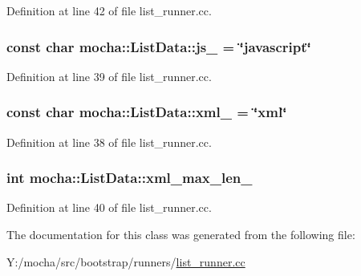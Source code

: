 Definition at line 42 of file list\_\-runner.cc.

\hypertarget{classmocha_1_1_list_data_afc7ac4f9f909eb970989228d912cd825}{
\subsubsection[{js\_\-}]{\setlength{\rightskip}{0pt plus 5cm}const char {\bf mocha::ListData::js\_\-} = \char`\"{}javascript\char`\"{}}}
\label{classmocha_1_1_list_data_afc7ac4f9f909eb970989228d912cd825}


Definition at line 39 of file list\_\-runner.cc.

\hypertarget{classmocha_1_1_list_data_a252cac8a2b901e070658b35d493c9e4e}{
\subsubsection[{xml\_\-}]{\setlength{\rightskip}{0pt plus 5cm}const char {\bf mocha::ListData::xml\_\-} = \char`\"{}xml\char`\"{}}}
\label{classmocha_1_1_list_data_a252cac8a2b901e070658b35d493c9e4e}


Definition at line 38 of file list\_\-runner.cc.

\hypertarget{classmocha_1_1_list_data_ae618b9825f02e59fa937652d53cb7d04}{
\subsubsection[{xml\_\-max\_\-len\_\-}]{\setlength{\rightskip}{0pt plus 5cm}int {\bf mocha::ListData::xml\_\-max\_\-len\_\-}}}
\label{classmocha_1_1_list_data_ae618b9825f02e59fa937652d53cb7d04}


Definition at line 40 of file list\_\-runner.cc.



The documentation for this class was generated from the following file:\begin{DoxyCompactItemize}
\item 
Y:/mocha/src/bootstrap/runners/\hyperlink{list__runner_8cc}{list\_\-runner.cc}\end{DoxyCompactItemize}
